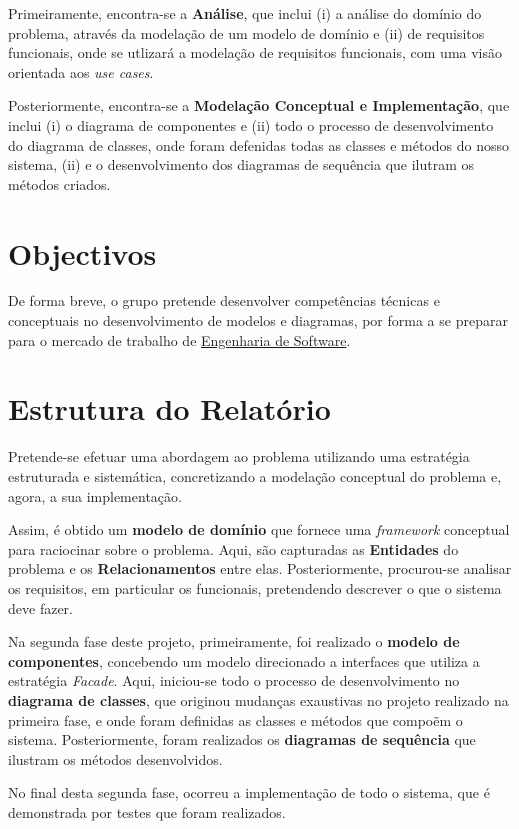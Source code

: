 \documentclass[a4paper,12pt]{scrreprt}
\begin{document}
Primeiramente, encontra-se a \textbf{Análise}, que inclui
(i) a análise do domínio do problema, através da modelação de um modelo de domínio e 
(ii) de requisitos funcionais, onde se utlizará a modelação de requisitos funcionais, com uma visão orientada aos \textit{use cases}.

Posteriormente, encontra-se a \textbf{Modelação Conceptual e Implementação}, que inclui
(i) o diagrama de componentes e 
(ii) todo o processo de desenvolvimento do diagrama de classes, onde foram defenidas todas as classes e métodos do nosso sistema,
(ii) e o desenvolvimento dos diagramas de sequência que ilutram os métodos criados.

\section{Objectivos}
De forma breve, o grupo pretende desenvolver competências técnicas e conceptuais no desenvolvimento de modelos e diagramas,
por forma a se preparar para o mercado de trabalho de \underline{Engenharia de Software}.


\section{Estrutura do Relatório}
Pretende-se efetuar uma abordagem ao problema utilizando uma estratégia estruturada e sistemática, concretizando a modelação conceptual do problema 
e, agora, a sua implementação.

Assim, é obtido um \textbf{modelo de domínio} que fornece uma \textit{framework} conceptual para raciocinar sobre o problema.
Aqui, são capturadas as \textbf{Entidades} do problema e os \textbf{Relacionamentos} entre elas. Posteriormente, procurou-se analisar os 
requisitos, em particular os funcionais, pretendendo descrever o que o sistema deve fazer.

Na segunda fase deste projeto, primeiramente, foi realizado o \textbf{modelo de componentes}, concebendo um modelo direcionado a interfaces que utiliza
a estratégia \textit{Facade}. Aqui, iniciou-se todo o processo de desenvolvimento no \textbf{diagrama de classes}, que originou mudanças exaustivas no projeto 
realizado na primeira fase, e onde foram definidas as classes e métodos que compoẽm o sistema. Posteriormente, foram realizados os \textbf{diagramas de sequência} 
que ilustram os métodos desenvolvidos.

No final desta segunda fase, ocorreu a implementação de todo o sistema, que é demonstrada por testes que foram realizados.
\end{document}
